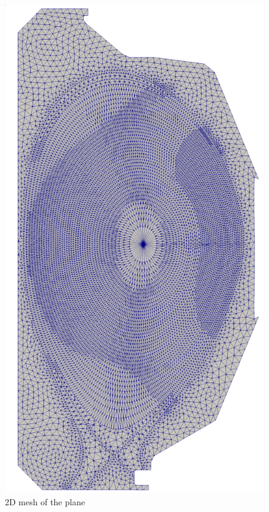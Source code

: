 \documentclass[aspectratio=169]{beamer}
\begin{document}
\begin{frame}
\begin{columns}
    \begin{column}{.3\textwidth}
      \begin{figure}
        \centering
        \includegraphics[height=.35\textheight]{itg24k.png}
        \caption*{2D mesh of the plane}
      \end{figure}
      \vspace{-.25cm}

\end{column}
\end{columns}
\end{frame}
\end{document}
